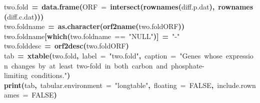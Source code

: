 \documentclass[letter]{article}\usepackage{graphicx, color}
\makeatletter
\newcommand{\hlnumber}[1]{\textcolor[rgb]{0,0,0}{#1}}%
\newcommand{\hlfunctioncall}[1]{\textcolor[rgb]{0.501960784313725,0,0.329411764705882}{\textbf{#1}}}%
\newcommand{\hlstring}[1]{\textcolor[rgb]{0.6,0.6,1}{#1}}%
\newcommand{\hlkeyword}[1]{\textcolor[rgb]{0,0,0}{\textbf{#1}}}%
\newcommand{\hlargument}[1]{\textcolor[rgb]{0.690196078431373,0.250980392156863,0.0196078431372549}{#1}}%
\newcommand{\hlassignement}[1]{\textcolor[rgb]{0,0,0}{\textbf{#1}}}%
\newcommand{\hlsymbol}[1]{\textcolor[rgb]{0,0,0}{#1}}%
\newcommand{\hlstd}[1]{\textcolor[rgb]{0,0,0}{#1}}%
\newenvironment{kframe}{%
 \def\FrameCommand##1{\hskip\@totalleftmargin \hskip-\fboxsep
 \colorbox{shadecolor}{##1}\hskip-\fboxsep
     \hskip-\linewidth \hskip-\@totalleftmargin \hskip\columnwidth}%
 \MakeFramed {\advance\hsize-\width
   \@totalleftmargin\z@ \linewidth\hsize
   \@setminipage}}%
 {\par\unskip\endMakeFramed}
\makeatother
\begin{document}
\begin{kframe}
\begin{flushleft}
\ttfamily\noindent
\hlsymbol{two.fold}{\ }\hlassignement{=}{\ }\hlfunctioncall{data.frame}\hlkeyword{(}\hlargument{ORF}{\ }\hlargument{=}{\ }\hlfunctioncall{intersect}\hlkeyword{(}\hlfunctioncall{rownames}\hlkeyword{(}\hlsymbol{diff.p.dat}\hlkeyword{)}\hlkeyword{,}{\ }\hlfunctioncall{rownames}\hlkeyword{(}\hlsymbol{diff.c.dat}\hlkeyword{)}\hlkeyword{)}\hlkeyword{)}\hspace*{\fill}\\
\hlstd{}\hlsymbol{two.fold}\hlkeyword{\usebox{\hlnormalsizeboxdollar}}\hlsymbol{name}{\ }\hlassignement{=}{\ }\hlfunctioncall{as.character}\hlkeyword{(}\hlfunctioncall{orf2name}\hlkeyword{(}\hlsymbol{two.fold}\hlkeyword{\usebox{\hlnormalsizeboxdollar}}\hlsymbol{ORF}\hlkeyword{)}\hlkeyword{)}\hspace*{\fill}\\
\hlstd{}\hlsymbol{two.fold}\hlkeyword{\usebox{\hlnormalsizeboxdollar}}\hlsymbol{name}\hlkeyword{[}\hlfunctioncall{which}\hlkeyword{(}\hlsymbol{two.fold}\hlkeyword{\usebox{\hlnormalsizeboxdollar}}\hlsymbol{name}{\ }=={\ }\hlstring{"{}NULL"{}}\hlkeyword{)}\hlkeyword{]}{\ }\hlassignement{=}{\ }\hlstring{"{}-"{}}\hspace*{\fill}\\
\hlstd{}\hlsymbol{two.fold}\hlkeyword{\usebox{\hlnormalsizeboxdollar}}\hlsymbol{desc}{\ }\hlassignement{=}{\ }\hlfunctioncall{orf2desc}\hlkeyword{(}\hlsymbol{two.fold}\hlkeyword{\usebox{\hlnormalsizeboxdollar}}\hlsymbol{ORF}\hlkeyword{)}\hspace*{\fill}\\
\hlstd{}\hlsymbol{tab}{\ }\hlassignement{=}{\ }\hlfunctioncall{xtable}\hlkeyword{(}\hlsymbol{two.fold}\hlkeyword{,}{\ }\hlargument{label}{\ }\hlargument{=}{\ }\hlstring{"{}two.fold"{}}\hlkeyword{,}{\ }\hlargument{caption}{\ }\hlargument{=}{\ }\hlstring{"{}Genes{\ }whose{\ }expression{\ }changes{\ }by{\ }at{\ }least{\ }two-fold{\ }in{\ }both{\ }carbon{\ }and{\ }phosphate-limiting{\ }conditions."{}}\hlkeyword{)}\hspace*{\fill}\\
\hlstd{}\hlfunctioncall{print}\hlkeyword{(}\hlsymbol{tab}\hlkeyword{,}{\ }\hlargument{tabular.environment}{\ }\hlargument{=}{\ }\hlstring{"{}longtable"{}}\hlkeyword{,}{\ }\hlargument{floating}{\ }\hlargument{=}{\ }\hlnumber{FALSE}\hlkeyword{,}{\ }\hlargument{include.rownames}{\ }\hlargument{=}{\ }\hlnumber{FALSE}\hlkeyword{)}\mbox{}
\normalfont
\end{flushleft}
\end{kframe}
\end{document}
